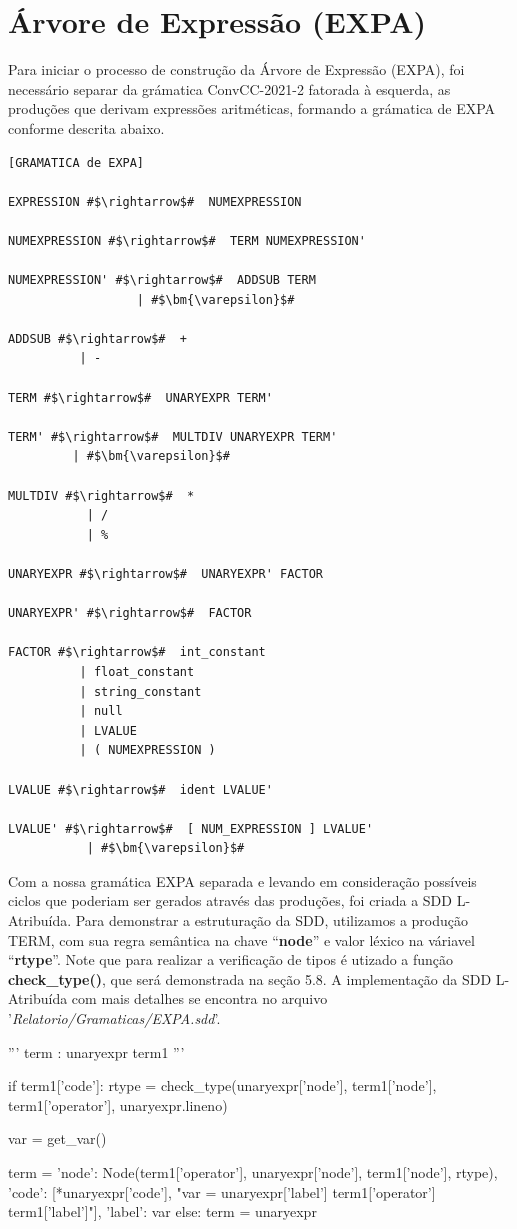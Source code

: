 \documentclass[
	12pt,				%
	openright,			%
	twoside,			%
	a4paper,			%
	english,			%
	french,				%
	spanish,			%
	brazil				%
	]{abntex2}
\begin{document}
\section{Árvore de Expressão (EXPA)}

Para iniciar o processo de construção da Árvore de Expressão (EXPA),
foi necessário separar da grámatica ConvCC-2021-2 fatorada à esquerda, as produções
que derivam expressões aritméticas, formando a grámatica de EXPA conforme descrita abaixo.

\begin{lstlisting}[escapechar=\#]
[GRAMATICA de EXPA]

EXPRESSION #$\rightarrow$#  NUMEXPRESSION 

NUMEXPRESSION #$\rightarrow$#  TERM NUMEXPRESSION' 

NUMEXPRESSION' #$\rightarrow$#  ADDSUB TERM 
                  | #$\bm{\varepsilon}$# 

ADDSUB #$\rightarrow$#  + 
          | - 

TERM #$\rightarrow$#  UNARYEXPR TERM' 

TERM' #$\rightarrow$#  MULTDIV UNARYEXPR TERM' 
         | #$\bm{\varepsilon}$# 

MULTDIV #$\rightarrow$#  * 
           | / 
           | % 

UNARYEXPR #$\rightarrow$#  UNARYEXPR' FACTOR 

UNARYEXPR' #$\rightarrow$#  FACTOR

FACTOR #$\rightarrow$#  int_constant 
          | float_constant 
          | string_constant 
          | null 
          | LVALUE 
          | ( NUMEXPRESSION ) 

LVALUE #$\rightarrow$#  ident LVALUE' 

LVALUE' #$\rightarrow$#  [ NUM_EXPRESSION ] LVALUE' 
           | #$\bm{\varepsilon}$#  
\end{lstlisting}

Com a nossa gramática EXPA separada e
levando em consideração possíveis ciclos que poderiam ser gerados através das produções,
foi criada a SDD L-Atribuída. Para demonstrar a estruturação da SDD,
utilizamos a produção TERM, com sua regra semântica na chave ``\textbf{node}'' e valor léxico na váriavel ``\textbf{rtype}''.
Note que para realizar a verificação de tipos é utizado a função \textbf{check\_type()}, que será
demonstrada na seção 5.8. A implementação da SDD L-Atribuída com mais detalhes se encontra no arquivo 
'\emph{Relatorio/Gramaticas/EXPA.sdd}'.

\begin{python}

'''
term : unaryexpr term1
'''

if term1['code']:
    rtype = check_type(unaryexpr['node'], term1['node'], term1['operator'], unaryexpr.lineno)

    var = get_var()


    term = {
        'node': Node(term1['operator'], unaryexpr['node'], term1['node'], rtype),
        'code': [*unaryexpr['code'], "{var} = {unaryexpr['label']} {term1['operator']} {term1['label']}"],
        'label': var
    } 
else:
    term = unaryexpr
\end{python}
\end{document}
